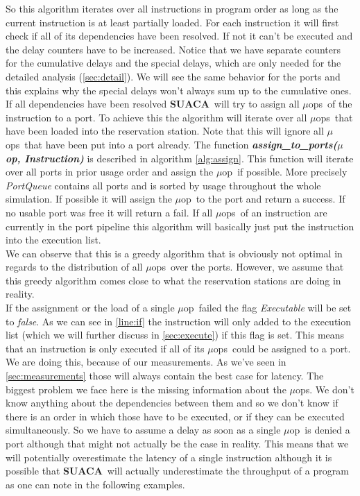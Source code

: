\documentclass[a4paper,12pt,titlepage, twoside]{report}
\newcommand{\suaca}{\textbf{SUACA}}
\newcommand{\microop}{$\mu$op}
\newcommand{\microops}{$\mu$ops}
\begin{document}
So this algorithm iterates over all instructions in program order as long as the current instruction is at least partially loaded. For each instruction it will first check if all of its dependencies have been resolved. If not it can't be executed and the delay counters have to be increased. Notice that we have separate counters for the cumulative delays and the special delays, which are only needed for the detailed analysis (\autoref{sec:detail}). We will see the same behavior for the ports and this explains why the special delays won't always sum up to the cumulative ones.\\
If all dependencies have been resolved \suaca\ will try to assign all \microops\ of the instruction to a port. To achieve this the algorithm will iterate over all \microops\ that have been loaded into the reservation station. Note that this will ignore all \microops\ that have been put into a port already. The function \textbf{\emph{assign\_to\_ports(\microop, Instruction)}} is described in algorithm \ref{alg:assign}. This function will iterate over all ports in prior usage order and assign the \microop\ if possible. More precisely \emph{PortQueue} contains all ports and is sorted by usage throughout the whole simulation. If possible it will assign the \microop\ to the port and return a success. If no usable port was free it will return a fail. If all \microops\ of an instruction are currently in the port pipeline this algorithm will basically just put the instruction into the execution list.\\
We can observe that this is a greedy algorithm that is obviously not optimal in regards to the distribution of all \microops\ over the ports. However, we assume that this greedy algorithm comes close to what the reservation stations are doing in reality.\\
If the assignment or the load of a single \microop\ failed the flag \emph{Executable} will be set to \emph{false}. As we can see in \autoref{line:if} the instruction will only added to the execution list (which we will further discuss in \autoref{sec:execute}) if this flag is set. This means that an instruction is only executed if all of its \microops\ could be assigned to a port. We are doing this, because of our measurements. As we've seen in \autoref{sec:measurements} those will always contain the best case for latency. The biggest problem we face here is the missing information about the \microops. We don't know anything about the dependencies between them and so we don't know if there is an order in which those have to be executed, or if they can be executed simultaneously. So we have to assume a delay as soon as a single \microop\ is denied a port although that might not actually be the case in reality. This means that we will potentially overestimate the latency of a single instruction although it is possible that \suaca\ will actually underestimate the throughput of a program as one can note in the following examples.\\
\end{document}
